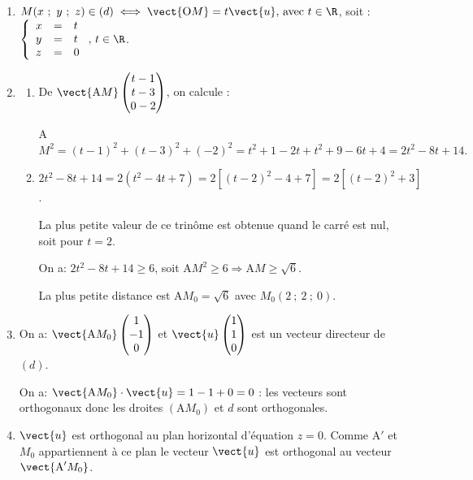  \begin{enumerate}
\item 
$M(x~;~y~;~z) \in (d) \iff \vect{\text{O}M} = t\vect{u}, \, \text{avec } t \in \R$, soit :
$\left\{\begin{array}{l c l}
x&=&t\\
y&=&t\\
z&=&0
\end{array}\right., \, t \in \R$.

\item 
\begin{enumerate}
\item  
De $\vect{\text{A}M}\begin{pmatrix}t - 1\\t - 3\\0 - 2\end{pmatrix}$, on calcule :

A$M^2 = (t - 1)^2 + (t - 3)^2 + (- 2)^2 = t^2 + 1 - 2t + t^2 + 9 - 6t + 4 = 2t^2 - 8t+ 14.$


\item 


$2t^2 - 8t+ 14 = 2\left(t^2 - 4t + 7\right) = 2\left[(t - 2)^2 -  4 + 7 \right] = 2\left[(t - 2)^2 + 3\right]$.

La plus petite valeur de ce trinôme est obtenue quand le carré est nul, soit pour $t = 2$.

On a: $2t^2 - 8t+ 14 \geqslant 6$, soit $\text{A}M^2 \geqslant 6 \Rightarrow \text{A}M \geqslant \sqrt{6}$.

La plus petite distance est A$M_0 = \sqrt{6}$ avec $M_0(2~;~2~;~0)$.
\end{enumerate}
\item 
On a: $\vect{\text{A}M_0}\begin{pmatrix}1\\- 1\\0\end{pmatrix}$ et $\vect{u}\begin{pmatrix}1\\ 1\\0\end{pmatrix}$ est un vecteur directeur de $(d)$.

On a: $\vect{\text{A}M_0} \cdot \vect{u} = 1 - 1 + 0 = 0$ : les vecteurs sont orthogonaux donc les droites $\left(\text{A}M_0\right)$ et $d$ sont orthogonales.
\item 


$\vect{u}$ est orthogonal au plan horizontal d'équation $z = 0$. Comme A$'$ et $M_0$ appartiennent à ce plan le vecteur $\vect{u}$ est orthogonal au vecteur $\vect{\text{A}'M_0}$.


\end{enumerate}
